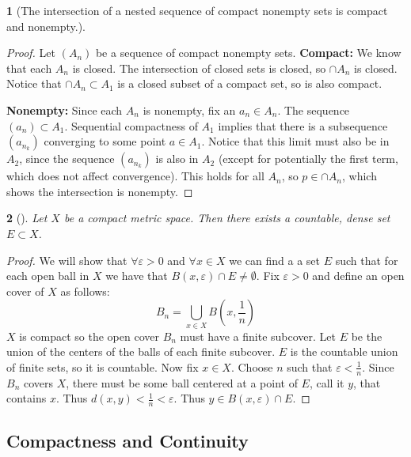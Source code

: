 \documentclass[12pt]{article}
\numberwithin{equation}{section}
\theoremstyle{plain}
\newtheorem{theorem}{\color{ForestGreen}{\textbf{Theorem}}}[section]
\theoremstyle{definition}
\def\ss{\subset}
\newcommand{\1}{\mathbbm 1}
\newcommand{\e}{\varepsilon}
\begin{document}
\begin{theorem}[The intersection of a nested sequence of compact nonempty sets is compact and nonempty.]
\end{theorem}
\begin{proof}
	Let $(A_n)$ be a sequence of compact nonempty sets. 
	\textbf{Compact:} We know that each $A_n$ is closed. The intersection of closed sets is closed, so $\cap A_n$ is closed. Notice that $\cap A_n \ss A_1$ is a closed subset of a compact set, so is also compact. 

	\textbf{Nonempty:} Since each $A_n$ is nonempty, fix an $a_n \in A_n$. The sequence $(a_n) \ss A_1$. Sequential compactness of $A_1$ implies that there is a subsequence $(a_{n_k})$ converging to some point $a \in A_1$. Notice that this limit must also be in $A_2$, since the sequence $(a_{n_k})$ is also in $A_2$ (except for potentially the first term, which does not affect convergence). This holds for all $A_n$, so $p \in \cap A_n$, which shows the intersection is nonempty.   
\end{proof}


\begin{theorem}[]
	Let $X$ be a compact metric space. Then there exists a countable, dense set $E \subset X$. 
\end{theorem}
\begin{proof}
	We will show that $\forall \e >0$ and $\forall x \in X$ we can find a a set $E$ such that for each open ball in $X$ we have that $B(x,\e) \cap E \neq \emptyset$. Fix $\e > 0$ and define an open cover of $X$ as follows:
	\begin{equation}
		B_n = \bigcup_{x \in X} B(x,\frac{1}{n})
	\end{equation}
	$X$ is compact so the open cover $B_n$ must have a finite subcover. Let $E$ be the union of the centers of the balls of each finite subcover. $E$ is the countable union of finite sets, so it is countable. Now fix $x \in X$. Choose $n$ such that $\e < \frac{1}{n}$. Since $B_n$ covers $X$, there must be some ball centered at a point of $E$, call it $y$, that contains $x$. Thus $d(x,y) < \frac{1}{n} < \e$. Thus $y \in B(x,\e) \cap E$. 
\end{proof}


\subsection{Compactness and Continuity}
\end{document}
